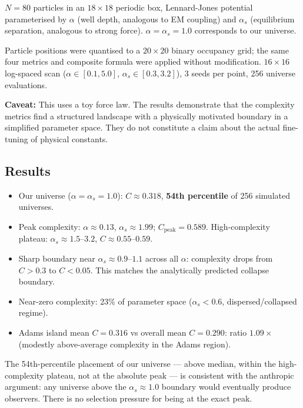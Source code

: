 \documentclass[12pt,a4paper]{article}
\begin{document}
$N = 80$ particles in an $18 \times 18$ periodic box, Lennard-Jones
potential parameterised by $\alpha$ (well depth, analogous to EM coupling)
and $\alpha_s$ (equilibrium separation, analogous to strong force).
$\alpha = \alpha_s = 1.0$ corresponds to our universe.

Particle positions were quantised to a $20 \times 20$ binary occupancy grid;
the same four metrics and composite formula were applied without modification.
$16 \times 16$ log-spaced scan ($\alpha \in [0.1, 5.0]$,
$\alpha_s \in [0.3, 3.2]$), 3 seeds per point, 256 universe evaluations.

\textbf{Caveat:} This uses a toy force law.
The results demonstrate that the complexity metrics find a structured landscape
with a physically motivated boundary in a simplified parameter space.
They do not constitute a claim about the actual fine-tuning of physical constants.

\subsection{Results}

\begin{itemize}[noitemsep]
  \item Our universe ($\alpha = \alpha_s = 1.0$): $C \approx 0.318$,
    \textbf{54th percentile} of 256 simulated universes.
  \item Peak complexity: $\alpha \approx 0.13$, $\alpha_s \approx 1.99$;
    $C_\text{peak} = 0.589$.
    High-complexity plateau: $\alpha_s \approx 1.5$--$3.2$,
    $C \approx 0.55$--$0.59$.
  \item Sharp boundary near $\alpha_s \approx 0.9$--$1.1$ across all $\alpha$:
    complexity drops from $C > 0.3$ to $C < 0.05$.
    This matches the analytically predicted collapse boundary.
  \item Near-zero complexity: 23\% of parameter space ($\alpha_s < 0.6$,
    dispersed/collapsed regime).
  \item Adams island mean $C = 0.316$ vs overall mean $C = 0.290$:
    ratio $1.09\times$ (modestly above-average complexity in the
    Adams region).
\end{itemize}

The 54th-percentile placement of our universe --- above median, within the
high-complexity plateau, not at the absolute peak --- is consistent with the
anthropic argument: any universe above the $\alpha_s \approx 1.0$ boundary
would eventually produce observers.
There is no selection pressure for being at the exact peak.
\end{document}
